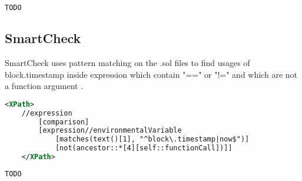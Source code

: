 \begin{lstlisting}[language=bash, caption="Oyente output for the time lock contract"]
    TODO
\end{lstlisting}

\subsection{SmartCheck}
SmartCheck uses pattern matching on the .sol files to find usages of block.timestamp inside expression which contain "==" or "!=" and which are not a function argument \cite{smartcheck}.
\begin{lstlisting}[language=xml]
    <XPath>
    //expression
        [comparison]
        [expression//environmentalVariable
            [matches(text()[1], "^block\.timestamp|now$")]
            [not(ancestor::*[4][self::functionCall])]]
    </XPath>
\end{lstlisting}

\begin{lstlisting}[language=bash, caption="Oyente output for the time lock contract"]
    TODO
\end{lstlisting}